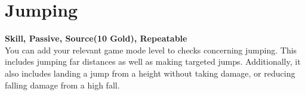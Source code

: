 \section{Jumping}\label{sec:jumping}
\textbf{Skill, Passive, Source(10 Gold), Repeatable}\\
You can add your relevant game mode level to checks concerning jumping.
This includes jumping far distances as well as making targeted jumps.
Additionally, it also includes landing a jump from a height without taking damage, or reducing falling damage from a high fall.